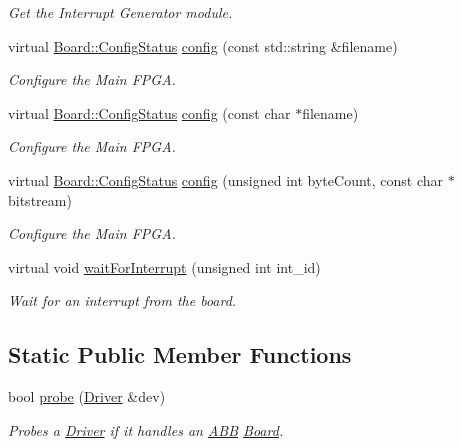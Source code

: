 \begin{CompactItemize}
\begin{CompactList}\small\item\em Get the Interrupt Generator module. \item\end{CompactList}\item 
virtual \hyperlink{classmprace_1_1Board_w4}{Board::Config\-Status} \hyperlink{classmprace_1_1ABB_a12}{config} (const std::string \&filename)
\begin{CompactList}\small\item\em Configure the Main FPGA. \item\end{CompactList}\item 
virtual \hyperlink{classmprace_1_1Board_w4}{Board::Config\-Status} \hyperlink{classmprace_1_1ABB_a13}{config} (const char $\ast$filename)
\begin{CompactList}\small\item\em Configure the Main FPGA. \item\end{CompactList}\item 
virtual \hyperlink{classmprace_1_1Board_w4}{Board::Config\-Status} \hyperlink{classmprace_1_1ABB_a14}{config} (unsigned int byte\-Count, const char $\ast$bitstream)
\begin{CompactList}\small\item\em Configure the Main FPGA. \item\end{CompactList}\item 
virtual void \hyperlink{classmprace_1_1ABB_a15}{wait\-For\-Interrupt} (unsigned int int\_\-id)
\begin{CompactList}\small\item\em Wait for an interrupt from the board. \item\end{CompactList}\end{CompactItemize}
\subsection*{Static Public Member Functions}
\begin{CompactItemize}
\item 
bool \hyperlink{classmprace_1_1ABB_e0}{probe} (\hyperlink{classmprace_1_1Driver}{Driver} \&dev)
\begin{CompactList}\small\item\em Probes a \hyperlink{classmprace_1_1Driver}{Driver} if it handles an \hyperlink{classmprace_1_1ABB}{ABB} \hyperlink{classmprace_1_1Board}{Board}. \item\end{CompactList}\end{CompactItemize}
